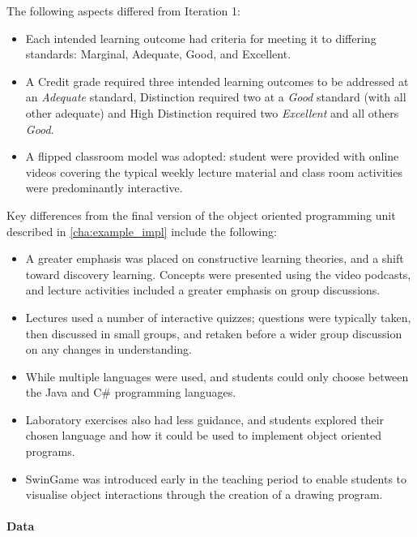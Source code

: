 The following aspects differed from Iteration 1:
\begin{itemize}[noitemsep,nolistsep]
  \item Each intended learning outcome had criteria for meeting it to differing standards: Marginal, Adequate, Good, and Excellent.
  \item A Credit grade required three intended learning outcomes to be addressed at an \emph{Adequate} standard, Distinction required two at a \emph{Good} standard (with all other adequate) and High Distinction required two \emph{Excellent} and all others \emph{Good}.
  \item A flipped classroom model \cite{Baker:2000,Lage:2000} was adopted: student were provided with online videos covering the typical weekly lecture material and class room activities were predominantly interactive.
\end{itemize}

Key differences from the final version of the object oriented programming unit described in \cref{cha:example_impl} include the following:
\begin{itemize}[noitemsep,nolistsep]
	\item A greater emphasis was placed on constructive learning theories, and a shift toward discovery learning. Concepts were presented using the video podcasts, and lecture activities included a greater emphasis on group discussions.
	\item Lectures used a number of interactive quizzes; questions were typically taken, then discussed in small groups, and retaken before a wider group discussion on any changes in understanding.
  \item While multiple languages were used, and students could only choose between the Java and C\# programming languages.
	\item Laboratory exercises also had less guidance, and students explored their chosen language and how it could be used to implement object oriented programs.
	\item SwinGame was introduced early in the teaching period to enable students to visualise object interactions through the creation of a drawing program.
\end{itemize}


\paragraph{Data} %
\label{ssub:data2}

